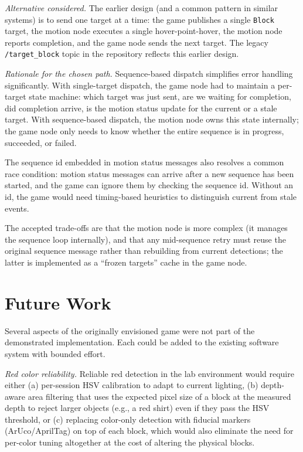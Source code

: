\documentclass[conference]{IEEEtran}
\begin{document}
\textit{Alternative considered.} The earlier design (and a common
pattern in similar systems) is to send one target at a time: the
game publishes a single \texttt{Block} target, the motion node
executes a single hover-point-hover, the motion node reports
completion, and the game node sends the next target. The legacy
\texttt{/target\_block} topic in the repository reflects this earlier
design.

\textit{Rationale for the chosen path.} Sequence-based dispatch
simplifies error handling significantly. With single-target dispatch,
the game node had to maintain a per-target state machine: which
target was just sent, are we waiting for completion, did completion
arrive, is the motion status update for the current or a stale target.
With sequence-based dispatch, the motion node owns this state
internally; the game node only needs to know whether the entire
sequence is in progress, succeeded, or failed.

The sequence id embedded in motion status messages also resolves a
common race condition: motion status messages can arrive after a
new sequence has been started, and the game can ignore them by checking
the sequence id. Without an id, the game would need timing-based
heuristics to distinguish current from stale events.

The accepted trade-offs are that the motion node is more complex
(it manages the sequence loop internally), and that any mid-sequence
retry must reuse the original sequence message rather than rebuilding
from current detections; the latter is implemented as a ``frozen
targets'' cache in the game node.

\section{Future Work}
\label{sec:future}

Several aspects of the originally envisioned game were not part of the
demonstrated implementation. Each could be added to the existing
software system with bounded effort.

\textit{Red color reliability.} Reliable red detection in the lab
environment would require either (a) per-session HSV calibration to
adapt to current lighting, (b) depth-aware area filtering that uses
the expected pixel size of a block at the measured depth to reject
larger objects (e.g., a red shirt) even if they pass the HSV threshold,
or (c) replacing color-only detection with fiducial markers
(ArUco/AprilTag) on top of each block, which would also eliminate the
need for per-color tuning altogether at the cost of altering the
physical blocks.
\end{document}

